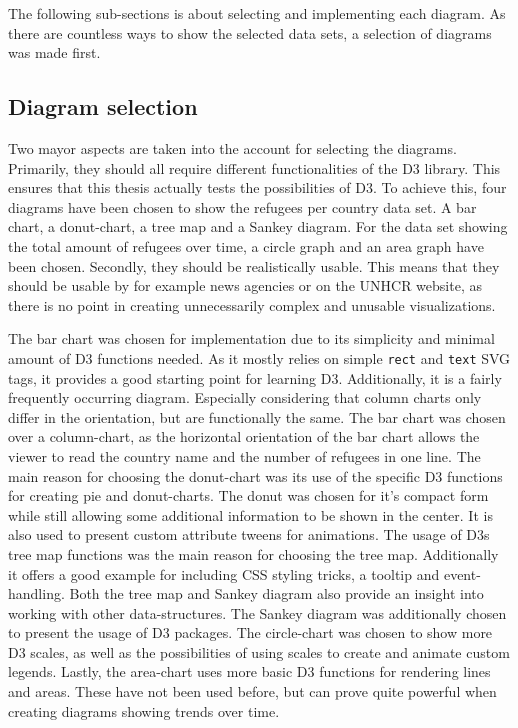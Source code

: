 The following sub-sections is about selecting and implementing each diagram. As there are countless ways to show the selected data sets, a selection of diagrams was made first.

\subsection{Diagram selection} \label{sec:diagram-selection}
Two mayor aspects are taken into the account for selecting the diagrams. Primarily, they should all require different functionalities of the D3 library. This ensures that this thesis actually tests the possibilities of D3. To achieve this, four diagrams have been chosen to show the refugees per country data set. A bar chart, a donut-chart, a tree map and a Sankey diagram. For the data set showing the total amount of refugees over time, a circle graph and an area graph have been chosen.
Secondly, they should be realistically usable. This means that they should be usable by for example news agencies or on the UNHCR website, as there is no point in creating unnecessarily complex and unusable visualizations.

The bar chart was chosen for implementation due to its simplicity and minimal amount of D3 functions needed. As it mostly relies on simple \texttt{rect} and \texttt{text} SVG tags, it provides a good starting point for learning D3. Additionally, it is a fairly frequently occurring diagram. Especially considering that column charts only differ in the orientation, but are functionally the same. The bar chart was chosen over a column-chart, as the horizontal orientation of the bar chart allows the viewer to read the country name and the number of refugees in one line.
The main reason for choosing the donut-chart was its use of the specific D3 functions for creating pie and donut-charts. The donut was chosen for it's compact form while still allowing some additional information to be shown in the center. It is also used to present custom attribute tweens for animations.
The usage of D3s tree map functions was the main reason for choosing the tree map. Additionally it offers a good example for including CSS styling tricks, a tooltip and event-handling.
Both the tree map and Sankey diagram also provide an insight into working with other data-structures. The Sankey diagram was additionally chosen to present the usage of D3 packages.
The circle-chart was chosen to show more D3 scales, as well as the possibilities of using scales to create and animate custom legends.
Lastly, the area-chart uses more basic D3 functions for rendering lines and areas. These have not been used before, but can prove quite powerful when creating diagrams showing trends over time.

